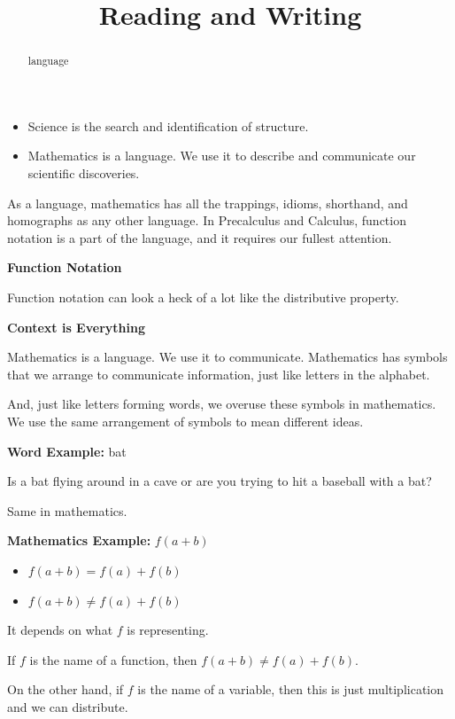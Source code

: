 \documentclass{ximera}
\title{Reading and Writing}
\begin{document}
\begin{abstract}
language
\end{abstract}
\maketitle


\begin{itemize}
\item Science is the search and identification of structure. 

\item Mathematics is a language. We use it to describe and communicate our scientific discoveries.
\end{itemize}

As a language, mathematics has all the trappings, idioms, shorthand, and homographs as any other language. In Precalculus and Calculus, function notation is a part of the language, and it requires our fullest attention.  


\begin{warning} \textbf{\textcolor{red!70!black}{Function Notation}}  



Function notation can look a heck of a lot like the distributive property. 


\begin{center}

\textbf{\textcolor{purple!85!blue}{Context is Everything}}

\end{center}


Mathematics is a language.  We use it to communicate.  Mathematics has symbols that we arrange to communicate information, just like letters in the alphabet. 

And, just like letters forming words, we overuse these symbols in mathematics.  We use the same arrangement of symbols to mean different ideas. 

\textbf{Word Example:} bat 

Is a bat flying around in a cave or are you trying to hit a baseball with a bat? 


Same in mathematics.



\textbf{Mathematics Example:} $f(a + b)$ 

\begin{itemize}
	\item $f(a + b) = f(a) + f(b)$
	\item $f(a + b) \ne f(a) + f(b)$
\end{itemize}


It depends on what $f$ is representing. 

If $f$ is the name of a function, then $f(a + b) \ne f(a) + f(b)$.  

On the other hand, if $f$ is the name of a variable, then this is just multiplication and we can distribute.



\end{warning}
\end{document}
